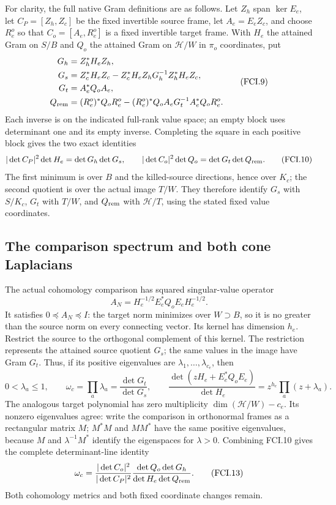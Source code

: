 For clarity, the full native Gram definitions are as follows.  Let
$Z_h$ span $\ker E_e$, let $C_P=[Z_h,Z_c]$ be the fixed invertible
source frame, let $A_e=E_eZ_c$, and choose $R_e^o$ so that
$C_o=[A_e,R_e^o]$ is a fixed invertible target frame.  With $H_e$
the attained Gram on $S/B$ and $Q_o$ the attained Gram on
$\mathcal H/W$ in $\pi_o$ coordinates, put
\[
 \begin{split}
 G_h&=Z_h^*H_eZ_h,\\
 G_s&=Z_c^*H_eZ_c-Z_c^*H_eZ_hG_h^{-1}Z_h^*H_eZ_c,\\
 G_t&=A_e^*Q_oA_e,\\
 Q_{\rm rem}&=(R_e^o)^*Q_oR_e^o
 -(R_e^o)^*Q_oA_eG_t^{-1}A_e^*Q_oR_e^o.
 \end{split}\tag{FCI.9}
\]
Each inverse is on the indicated full-rank value space; an empty
block uses determinant one and its empty inverse.  Completing the
square in each positive block gives the two exact identities
\[
 |\det C_P|^2\det H_e=\det G_h\det G_s,\qquad
 |\det C_o|^2\det Q_o=\det G_t\det Q_{\rm rem}.
 \tag{FCI.10}
\]
The first minimum is over $B$ and the killed-source directions,
hence over $K_c$; the second quotient is over the actual image
$T/W$.  They therefore identify $G_s$ with $S/K_c$, $G_t$ with
$T/W$, and $Q_{\rm rem}$ with $\mathcal H/T$, using the stated
fixed value coordinates.

\subsection{The comparison spectrum and both cone Laplacians}

The actual cohomology comparison has squared singular-value operator
\[
 A_N=H_e^{-1/2}E_e^*Q_oE_eH_e^{-1/2}.
 \tag{FCI.11}
\]
It satisfies $0\preceq A_N\preceq I$: the target norm minimizes
over $W\supset B$, so it is no greater than the source norm on
every connecting vector.  Its kernel has dimension $h_e$.
Restrict the source to the orthogonal complement of this kernel.
The restriction represents the attained source quotient $G_s$;
the same values in the image have Gram $G_t$.  Thus, if its positive
eigenvalues are $\lambda_1,\ldots,\lambda_{c_e}$, then
\[
 0<\lambda_a\leq1,\qquad
 \omega_c=\prod_a\lambda_a=\frac{\det G_t}{\det G_s},\qquad
 \frac{\det(zH_e+E_e^*Q_oE_e)}{\det H_e}
       =z^{h_e}\prod_a(z+\lambda_a).
 \tag{FCI.12}
\]
The analogous target polynomial has zero multiplicity
$\dim(\mathcal H/W)-c_e$.  Its nonzero eigenvalues agree:
write the comparison in orthonormal frames as a rectangular matrix
$M$; $M^*M$ and $MM^*$ have the same positive eigenvalues, because
$M$ and $\lambda^{-1}M^*$ identify the eigenspaces for $\lambda>0$.
Combining FCI.10 gives the complete determinant-line identity
\[
 \omega_c=\frac{|\det C_o|^2}{|\det C_P|^2}
       \frac{\det Q_o\det G_h}{\det H_e\det Q_{\rm rem}}.
 \tag{FCI.13}
\]
Both cohomology metrics and both fixed coordinate changes remain.

